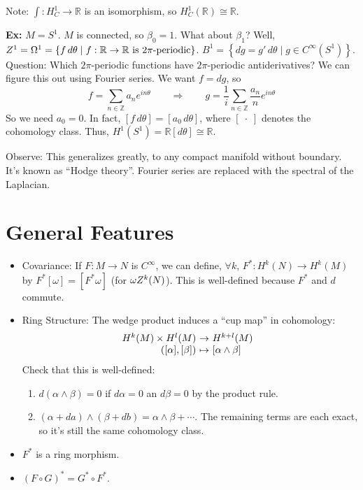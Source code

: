 \documentclass[10pt,letterpaper]{article}
\newcommand{\n}{\hfill\break}
\newcommand{\hangblock}[2]{\par\noindent\settowidth{\hangindent}{\textbf{#1: }}\textbf{#1: }\nolinebreak#2}
\newcommand{\ex}[1]{\hangblock{Ex}{#1}}
\newcommand{\ptxt}[1]{\textrm{\textnormal{#1}}}
\newcommand{\set}[1]{\left\{#1\right\}}
\newcommand{\integers}{\mathbb{Z}}
\newcommand{\Z}{\integers}
\newcommand{\reals}{\mathbb{R}}
\newcommand{\R}{\reals}
\newcommand{\of}{\circ}
\newcommand{\map}[4]{\!\!\!\begin{array}[t]{rcl}#1 & \!\!\!\!\to & \!\!\!\!#2\\ {}#3 & \!\!\!\!\mapsto & \!\!\!\!#4\end{array}}
\begin{document}
\par\noindent
Note: $\int:H_{C}^{1}\to\R$ is an isomorphism, so $H_{C}^{1}(\R)\cong\R$.\n

\ex{
	$M=S^{1}$. $M$ is connected, so $\beta_{0}=1$. What about $\beta_{1}$? Well,\n
	$Z^{1}=\Omega^{1}=\set{f\,d\theta\mid{}f:\R\to\R\ptxt{ is $2\pi$-periodic}}$.\n
	$B^{1}=\set{dg=g'\,d\theta\mid{}g\in{}C^{\infty}(S^{1})}$.\n
	Question: Which $2\pi$-periodic functions have $2\pi$-periodic antiderivatives? We can figure this out using Fourier series. We want $f=dg$, so
	\[
		f=\sum_{n\in\Z}a_{n}e^{in\theta}\qquad\Rightarrow\qquad{}g=\frac{1}{i}\sum_{n\in\Z}\frac{a_{n}}{n}e^{in\theta}
	\]
	So we need $a_{0}=0$. In fact, $[f\,d\theta]=[a_{0}\,d\theta]$, where $[\;\cdot\;]$ denotes the cohomology class. Thus, $H^{1}(S^{1})=\R[d\theta]\cong\R$.\n
}

\par\noindent
Observe: This generalizes greatly, to any compact manifold without boundary. It's known as ``Hodge theory''. Fourier series are replaced with the spectral of the Laplacian.\n

\newpage
\section*{General Features}

\begin{itemize}
	\item Covariance: If $F:M\to{}N$ is $C^{\infty}$, we can define, $\forall{}k$, $F^{*}:H^{k}(N)\to{}H^{k}(M)$ by $F^{*}[\omega]=[F^{*}\omega]$ (for $\omega\n{}Z^{k}(N)$). This is well-defined because $F^{*}$ and $d$ commute.
	\item Ring Structure: The wedge product induces a ``cup map'' in cohomology:
	\[
		\map{H^{k}(M)\times{}H^{l}(M)}{H^{k+l}(M)}{([\alpha],[\beta])}{[\alpha\wedge\beta]}
	\]
	Check that this is well-defined:
	\begin{enumerate}[label=\alph*)]
		\item $d(\alpha\wedge\beta)=0$ if $d\alpha=0$ an $d\beta=0$ by the product rule.
		\item $(\alpha+da)\wedge(\beta+db)=\alpha\wedge\beta+\cdots$. The remaining terms are each exact, so it's still the same cohomology class.
	\end{enumerate}
	\item $F^{*}$ is a ring morphism.
	\item $(F\of{}G)^{*}=G^{*}\of{}F^{*}$.
\end{itemize}
\end{document}
